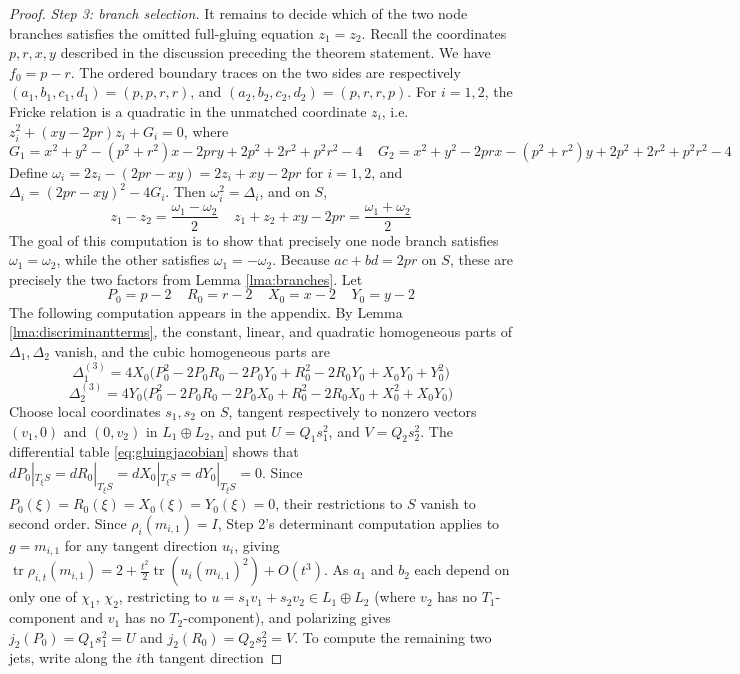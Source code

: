 \documentclass{article}
\DeclareMathOperator{\tr}{tr}
\theoremstyle{plain}
\theoremstyle{definition}
\theoremstyle{plain}
\theoremstyle{plain}
\theoremstyle{plain}
\theoremstyle{remark}
\theoremstyle{remark}
\theoremstyle{plain}
\theoremstyle{plain}
\newcounter{main}
\theoremstyle{plain}
\theoremstyle{plain}
\begin{document}
\begin{proof}
\medskip

\emph{Step 3: branch selection.} It remains to decide which of the two node branches satisfies the omitted full-gluing equation $z_1=z_2$. Recall the coordinates $p, r, x, y$ described in the discussion preceding the theorem statement. We have $f_0 = p - r$. The ordered boundary traces on the two sides are respectively $(a_1, b_1, c_1, d_1) = (p, p, r, r)$, and $(a_2, b_2, c_2, d_2) = (p, r, r, p)$. For $i = 1, 2$, the Fricke relation is a quadratic in the unmatched coordinate $z_i$, i.e. $z_i^2+(xy-2pr)z_i+G_i=0$, where
\begin{equation*}
	G_1 = x^2 + y^2 - (p^2 + r^2)x - 2pry + 2p^2 + 2r^2 + p^2r^2 - 4 \ \ \ \ \ G_2 = x^2 + y^2 - 2prx - (p^2 + r^2)y + 2p^2 + 2r^2 + p^2r^2 - 4
\end{equation*} 
Define $\omega_i = 2z_i - (2pr - xy) = 2z_i + xy - 2pr$ for $i = 1, 2$, and $\Delta_i = (2pr - xy)^2 - 4G_i$. Then $\omega_i^2 = \Delta_i$, and on $S$, 
\begin{equation*}
	z_1 - z_2 = \frac{\omega_1 - \omega_2}{2} \ \ \ \ \ z_1 + z_2 + xy - 2pr = \frac{\omega_1 + \omega_2}{2}
\end{equation*}
The goal of this computation is to show that precisely one node branch satisfies $\omega_1 = \omega_2$, while the other satisfies $\omega_1 = -\omega_2$. Because $ac+bd = 2pr$ on $S$, these are precisely the two factors from Lemma \ref{lma:branches}. Let
\begin{equation*}
	P_0 = p - 2 \ \ \ \ \ R_0 = r - 2 \ \ \ \ \ X_0 = x - 2 \ \ \ \ \ Y_0 = y - 2
\end{equation*}
The following computation appears in the appendix. By Lemma \ref{lma:discriminantterms}, the constant, linear, and quadratic homogeneous parts of $\Delta_1, \Delta_2$ vanish, and the cubic homogeneous parts are 
\begin{equation*}
	\Delta_1^{(3)} = 4X_0\bigl(P_0^2 - 2P_0R_0 - 2P_0Y_0 + R_0^2 - 2R_0Y_0 + X_0Y_0 + Y_0^2\bigr)
\end{equation*}
\begin{equation*}
	\Delta_2^{(3)} = 4Y_0\bigl(P_0^2 - 2P_0R_0 - 2P_0X_0 + R_0^2 - 2R_0X_0 + X_0^2 + X_0Y_0\bigr)
\end{equation*}
Choose local coordinates $s_1, s_2$ on $S$, tangent respectively to nonzero vectors $(v_1, 0)$ and $(0, v_2)$ in $L_1 \oplus L_2$, and put $U = Q_1s_1^2$, and $V = Q_2s_2^2$. The differential table \eqref{eq:gluingjacobian} shows that $dP_0|_{T_\xi S} = dR_0|_{T_\xi S} = dX_0|_{T_\xi S} = dY_0|_{T_\xi S} = 0$. Since $P_0(\xi) = R_0(\xi) = X_0(\xi) = Y_0(\xi) = 0$, their restrictions to $S$ vanish to second order. Since $\rho_i(m_{i, 1}) = I$, Step 2's determinant computation applies to $g = m_{i, 1}$ for any tangent direction $u_i$, giving $\tr\rho_{i,t}(m_{i,1}) = 2 + \frac{t^2}{2}\tr(u_i(m_{i,1})^2) + O(t^3)$. As $a_1$ and $b_2$ each depend on only one of $\chi_1$, $\chi_2$, restricting to $u = s_1v_1 + s_2v_2 \in L_1 \oplus L_2$ (where $v_2$ has no $T_1$-component and $v_1$ has no $T_2$-component), and polarizing gives $j_2(P_0) = Q_1s_1^2 = U$ and $j_2(R_0) = Q_2s_2^2 = V$. To compute the remaining two jets, write along the $i$th tangent direction

\end{proof}
\end{document}
